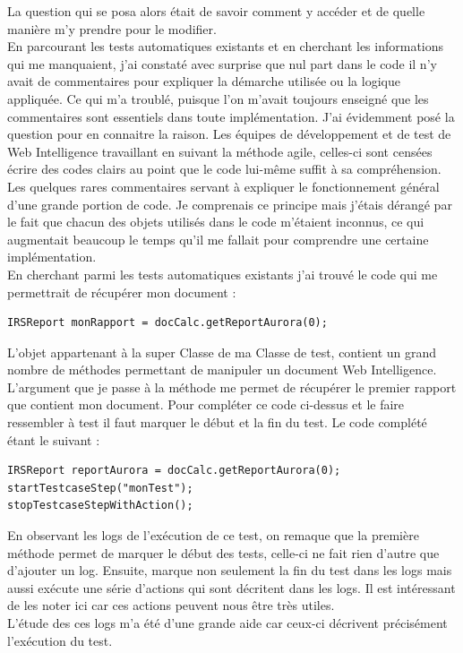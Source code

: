 La question qui se posa alors \'{e}tait de savoir comment y acc\'{e}der et de quelle mani\`{e}re m'y prendre pour le modifier.\\
En parcourant les tests automatiques existants et en cherchant les informations qui me manquaient, j'ai constat\'{e} avec surprise que nul part dans le code il n'y avait de commentaires pour expliquer la d\'{e}marche utilis\'{e}e ou la logique appliqu\'{e}e. Ce qui m'a troubl\'{e}, puisque l'on m'avait toujours enseign\'{e} que les commentaires sont essentiels dans toute impl\'{e}mentation. J'ai \'{e}videmment pos\'{e} la question pour en connaitre la raison. Les \'{e}quipes de d\'{e}veloppement et de test de Web Intelligence travaillant en suivant la m\'{e}thode agile, celles-ci sont cens\'{e}es \'{e}crire des codes clairs au point que le code lui-m\^{e}me suffit \`{a} sa compr\'{e}hension. Les quelques rares commentaires servant \`{a} expliquer le fonctionnement g\'{e}n\'{e}ral d'une grande portion de code. Je comprenais ce principe mais j'\'{e}tais d\'{e}rang\'{e} par le fait que chacun des objets utilis\'{e}s dans le code m'\'{e}taient inconnus, ce qui augmentait beaucoup le temps qu'il me fallait pour comprendre une certaine impl\'{e}mentation.\\ 

En cherchant parmi les tests automatiques existants j'ai trouv\'{e} le code qui me permettrait de r\'{e}cup\'{e}rer mon document :
\begin{lstlisting}
IRSReport monRapport = docCalc.getReportAurora(0);
\end{lstlisting}

L'objet  appartenant \`{a} la super \gls{Classe} de ma \gls{Classe} de test, contient un grand nombre de m\'{e}thodes permettant de manipuler un document Web Intelligence. L'argument  que je passe \`{a} la m\'{e}thode me permet de r\'{e}cup\'{e}rer le premier rapport que contient mon document. Pour compl\'{e}ter ce code ci-dessus et le faire ressembler \`{a} test il faut marquer le d\'{e}but et la fin du test. Le code compl\'{e}t\'{e} \'{e}tant le suivant :


\begin{lstlisting}
IRSReport reportAurora = docCalc.getReportAurora(0);
startTestcaseStep("monTest");
stopTestcaseStepWithAction();
\end{lstlisting}
 
En observant les logs de l'ex\'{e}cution de ce test, on remaque que la premi\`{e}re m\'{e}thode  permet de marquer le d\'{e}but des tests, celle-ci ne fait rien d'autre que d'ajouter un log. Ensuite,  marque non seulement la fin du test dans les logs mais aussi ex\'{e}cute une s\'{e}rie d'actions qui sont d\'{e}critent dans les logs. Il est int\'{e}ressant de les noter ici car ces actions peuvent nous \^{e}tre tr\`{e}s utiles.\\
L'\'{e}tude des ces logs m'a \'{e}t\'{e} d'une grande aide car ceux-ci d\'{e}crivent pr\'{e}cis\'{e}ment l'ex\'{e}cution du test.\\




